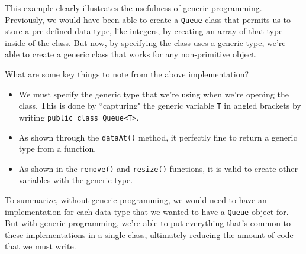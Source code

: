 This example clearly illustrates the usefulness of generic programming. Previously, we would have been able to create a \verb!Queue! class that permits us to store a pre-defined data type, like integers, by creating an array of that type inside of the class. But now, by specifying the class uses a generic type, we're able to create a generic class that works for any non-primitive object. 

What are some key things to note from the above implementation?
\begin{itemize}
    \item We must specify the generic type that we're using when we're opening the class. This is done by ``capturing" the generic variable \verb!T! in angled brackets by writing \verb!public class Queue<T>!. 
    \item As shown through the \verb!dataAt()! method, it perfectly fine to return a generic type from a function.
    \item As shown in the \verb!remove()! and \verb!resize()! functions, it is valid to create other variables with the generic type. 
\end{itemize}

To summarize, without generic programming, we would need to have an implementation for each data type that we wanted to have a \verb!Queue! object for. But with generic programming, we're able to put everything that's common to these implementations in a single class, ultimately reducing the amount of code that we must write.